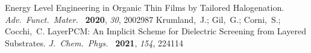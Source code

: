 \documentclass[journal=jpclcd,manuscript=letter]{achemso}
\begin{document}
\begin{mcitethebibliography}{51}
    Energy Level Engineering in Organic Thin Films by Tailored
  Halogenation. \emph{Adv.~Funct.~Mater.~} \textbf{2020}, \emph{30},
  2002987\relax
\mciteBstWouldAddEndPuncttrue
\mciteSetBstMidEndSepPunct{\mcitedefaultmidpunct}
{\mcitedefaultendpunct}{\mcitedefaultseppunct}\relax
\EndOfBibitem
{}
Krumland,~J.; Gil,~G.; Corni,~S.; Cocchi,~C. LayerPCM: An Implicit Scheme for
  Dielectric Screening from Layered Substrates. \emph{J.~Chem.~Phys.~}
  \textbf{2021}, \emph{154}, 224114\relax
\mciteBstWouldAddEndPuncttrue
\mciteSetBstMidEndSepPunct{\mcitedefaultmidpunct}
{\mcitedefaultendpunct}{\mcitedefaultseppunct}\relax
\EndOfBibitem
\end{mcitethebibliography}
\end{document}
